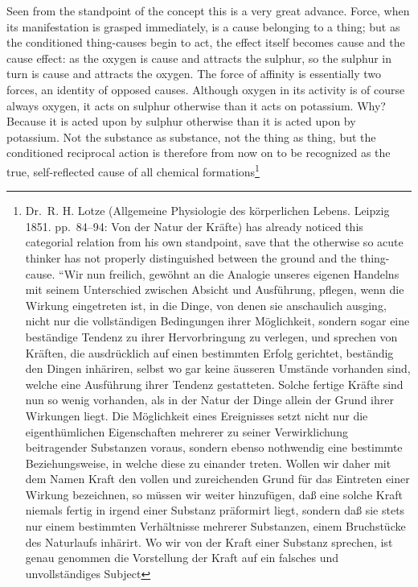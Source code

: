 \documentclass[12pt,a4paper]{book}
\begin{document}
Seen from the standpoint of the concept this is a very great advance. Force,
when its manifestation is grasped immediately, is a cause belonging to a thing;
but as the conditioned thing-causes begin to act, the effect itself becomes
cause and the cause effect: as the oxygen is cause and attracts the sulphur, so
the sulphur in turn is cause and attracts the oxygen. The force of affinity is
essentially two forces, an identity of opposed causes. Although oxygen in its
activity is of course always oxygen, it acts on sulphur otherwise than it acts
on potassium. Why? Because it is acted upon by sulphur otherwise than it is
acted upon by potassium. Not the substance as substance, not the thing as
thing, but the conditioned reciprocal action is therefore from now on to be
recognized as the true, self-reflected cause of all chemical
formations\footnote{Dr.\ R. H. Lotze (Allgemeine Physiologie des körperlichen
Lebens. Leipzig 1851. pp.~84--94: Von der Natur der Kräfte) has already noticed
this categorial relation from his own standpoint, save that the otherwise so
acute thinker has not properly distinguished between the ground and the
thing-cause. ``Wir nun
freilich, gewöhnt an die Analogie unseres eigenen Handelns mit
seinem Unterschied zwischen Absicht und Ausführung, pflegen, wenn
die Wirkung eingetreten ist, in die Dinge, von denen sie anschaulich
ausging, nicht nur die vollständigen Bedingungen ihrer Möglichkeit,
sondern sogar eine beständige Tendenz zu ihrer Hervorbringung
zu verlegen, und sprechen von Kräften, die ausdrücklich auf einen
bestimmten Erfolg gerichtet, beständig den Dingen inhäriren, selbst
wo gar keine äusseren Umstände vorhanden sind, welche eine
Ausführung ihrer Tendenz gestatteten. Solche fertige Kräfte sind nun
so wenig vorhanden, als in der Natur der Dinge allein der Grund
ihrer Wirkungen liegt. Die Möglichkeit eines Ereignisses setzt nicht
nur die eigenthümlichen Eigenschaften mehrerer zu seiner
Verwirklichung beitragender Substanzen voraus, sondern ebenso
nothwendig eine bestimmte Beziehungsweise, in welche diese zu
einander treten. Wollen wir daher mit dem Namen Kraft den vollen
und zureichenden Grund für das Eintreten einer Wirkung bezeichnen,
so müssen wir weiter hinzufügen, daß eine solche Kraft
niemals fertig in irgend einer Substanz präformirt liegt, sondern
daß sie stets nur einem bestimmten Verhältnisse mehrerer Substanzen,
einem Bruchstücke des Naturlaufs inhärirt. Wo wir von
der Kraft einer Substanz sprechen, ist genau genommen die
Vorstellung der Kraft auf ein falsches und unvollständiges Subject
}
\end{document}

